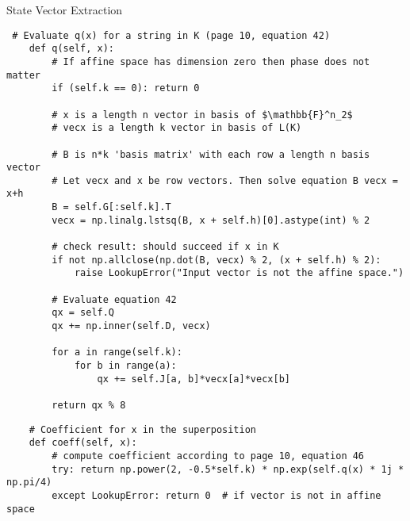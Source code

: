 \documentclass[a4paper]{article}
\begin{document}
\renewcommand{\theFancyVerbLine}{
  \sffamily\textcolor[rgb]{0.1,0.1,0.1}{\scriptsize\arabic{FancyVerbLine}}}


\begin{center}
    \Large State Vector Extraction
\end{center}



\begin{verbatim}
 # Evaluate q(x) for a string in K (page 10, equation 42)
    def q(self, x):
        # If affine space has dimension zero then phase does not matter
        if (self.k == 0): return 0

        # x is a length n vector in basis of $\mathbb{F}^n_2$
        # vecx is a length k vector in basis of L(K)

        # B is n*k 'basis matrix' with each row a length n basis vector
        # Let vecx and x be row vectors. Then solve equation B vecx = x+h
        B = self.G[:self.k].T
        vecx = np.linalg.lstsq(B, x + self.h)[0].astype(int) % 2

        # check result: should succeed if x in K
        if not np.allclose(np.dot(B, vecx) % 2, (x + self.h) % 2):
            raise LookupError("Input vector is not the affine space.")

        # Evaluate equation 42
        qx = self.Q
        qx += np.inner(self.D, vecx)

        for a in range(self.k):
            for b in range(a):
                qx += self.J[a, b]*vecx[a]*vecx[b]

        return qx % 8
\end{verbatim}

\begin{verbatim}
    # Coefficient for x in the superposition
    def coeff(self, x):
        # compute coefficient according to page 10, equation 46
        try: return np.power(2, -0.5*self.k) * np.exp(self.q(x) * 1j * np.pi/4)
        except LookupError: return 0  # if vector is not in affine space
\end{verbatim}
\end{document}
